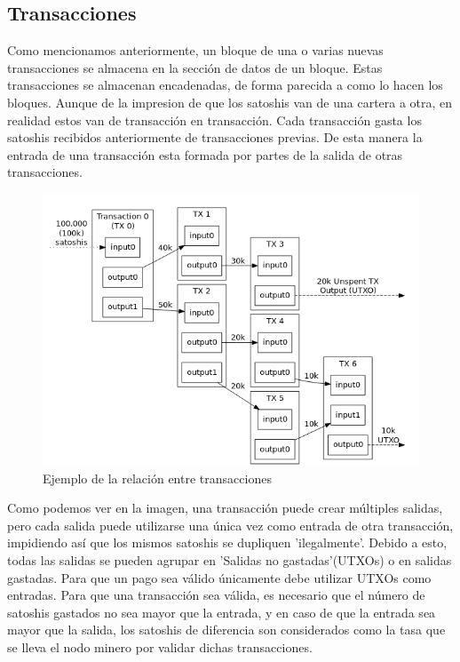 \documentclass[11pt,a4paper]{article}
\begin{document}
\subsection{Transacciones}

Como mencionamos anteriormente, un bloque de una o varias nuevas transacciones se almacena en la sección de datos de un bloque. Estas transacciones se almacenan encadenadas, de forma parecida a como lo hacen los bloques. Aunque de la impresion de que los satoshis van de una cartera a otra, en realidad estos van de transacción en transacción. Cada transacción gasta los satoshis recibidos anteriormente de transacciones previas. De esta manera la entrada de una transacción esta formada por partes de la salida de otras transacciones. \\

\begin{figure}[h]
	\includegraphics[width=12cm]{transactions.png}
	\centering		
	\caption{Ejemplo de la relación entre transacciones}
	\label{p4}
\end{figure}

Como podemos ver en la imagen, una transacción puede crear múltiples salidas, pero cada salida puede utilizarse una única vez como entrada de otra transacción, impidiendo así que los mismos satoshis se dupliquen 'ilegalmente'. Debido a esto, todas las salidas se pueden agrupar en 'Salidas no gastadas'(UTXOs) o en salidas gastadas. Para que un pago sea válido únicamente debe utilizar UTXOs como entradas. Para que una transacción sea válida, es necesario que el número de satoshis gastados no sea mayor que la entrada, y en caso de que la entrada sea mayor que la salida, los satoshis de diferencia son considerados como la tasa que se lleva el nodo minero por validar dichas transacciones.\\
\end{document}
